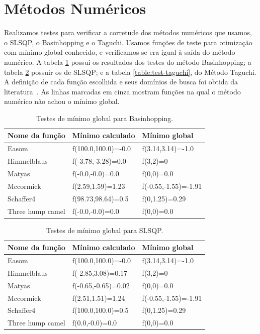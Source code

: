 \documentclass[]{politex}
\begin{document}
\section{Métodos Numéricos}
Realizamos testes para verificar a corretude dos métodos numéricos que usamos,
o SLSQP, o Basinhopping e o Taguchi. Usamos funções de teste para otimização
com mínimo global conhecido, e verificamos se era igual à saída do método
numérico. A tabela \ref{table:test-bh} possui os resultados dos testes do método
Basinhopping; a tabela \ref{table:test-slsqp} possuir os de SLSQP; e a tabela
\ref{table:test-taguchi}, do Método Taguchi. A definição de cada função escolhida e
seus domínios de busca foi obtida da literatura~\cite{optimization-functions}.
As linhas marcadas em cinza mostram funções na qual o método numérico não achou
o mínimo global.

\begin{table}[H]
\centering
\begin{tabular}{l|l|l}
 Nome da função & Mínimo calculado & Mínimo global \\ \hline
\rowcolor{Gray}
Easom  &  f(100.0,100.0)=-0.0  &  f(3.14,3.14)=-1.0 \\
Himmelblaus  &  f(-3.78,-3.28)=0.0  &  f(3,2)=0 \\
Matyas  &  f(-0.0,-0.0)=0.0  &  f(0,0)=0.0 \\
\rowcolor{Gray}
Mccormick  &  f(2.59,1.59)=1.23  &  f(-0.55,-1.55)=-1.91 \\
\rowcolor{Gray}
Schaffer4  &  f(98.73,98.64)=0.5  &  f(0,1.25)=0.29 \\
Three hump camel  &  f(-0.0,-0.0)=0.0  &  f(0,0)=0.0 \\
\end{tabular}
\caption{Testes de mínimo global para Basinhopping.}
\label{table:test-bh}
\end{table}

\begin{table}[H]
\centering
\begin{tabular}{l|l|l}
 Nome da função & Mínimo calculado & Mínimo global \\ \hline
\rowcolor{Gray}
Easom  &  f(100.0,100.0)=-0.0  &  f(3.14,3.14)=-1.0 \\
\rowcolor{Gray}
Himmelblaus  &  f(-2.85,3.08)=0.17  &  f(3,2)=0 \\
\rowcolor{Gray}
Matyas  &  f(-0.65,-0.65)=0.02  &  f(0,0)=0.0 \\
\rowcolor{Gray}
Mccormick  &  f(2.51,1.51)=1.24  &  f(-0.55,-1.55)=-1.91 \\
\rowcolor{Gray}
Schaffer4  &  f(100.0,100.0)=0.5  &  f(0,1.25)=0.29 \\
Three hump camel  &  f(0.0,-0.0)=0.0  &  f(0,0)=0.0 \\
\end{tabular}
\caption{Testes de mínimo global para SLSQP.}
\label{table:test-slsqp}
\end{table}
\end{document}
